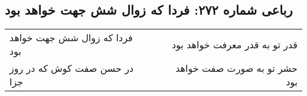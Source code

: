 \begin{center}
\section*{رباعی شماره ۲۷۲: فردا که زوال شش جهت خواهد بود}
\label{sec:sh272}
\begin{longtable}{l p{0.5cm} r}
فردا که زوال شش جهت خواهد بود
&&
قدر تو به قدر معرفت خواهد بود
\\
در حسن صفت کوش که در روز جزا
&&
حشر تو به صورت صفت خواهد بود
\\
\end{longtable}
\end{center}
